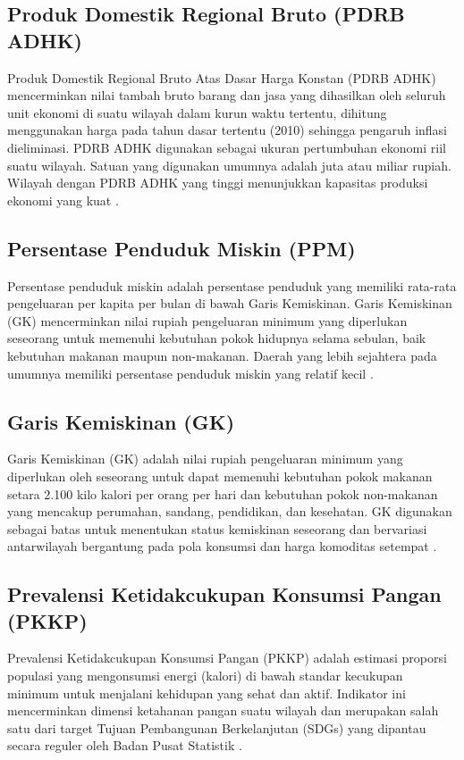 \subsection{\normalsize Produk Domestik Regional Bruto (PDRB ADHK)}
Produk Domestik Regional Bruto Atas Dasar Harga Konstan (PDRB ADHK) mencerminkan nilai tambah bruto barang dan jasa yang dihasilkan oleh seluruh unit ekonomi di suatu wilayah dalam kurun waktu tertentu, dihitung menggunakan harga pada tahun dasar tertentu (2010) sehingga pengaruh inflasi dieliminasi. PDRB ADHK digunakan sebagai ukuran pertumbuhan ekonomi riil suatu wilayah. Satuan yang digunakan umumnya adalah juta atau miliar rupiah. Wilayah dengan PDRB ADHK yang tinggi menunjukkan kapasitas produksi ekonomi yang kuat \citep{bpsikr2025}.

\subsection{\normalsize Persentase Penduduk Miskin (PPM)}
Persentase penduduk miskin adalah persentase penduduk yang memiliki rata-rata pengeluaran per kapita per bulan di bawah Garis Kemiskinan. Garis Kemiskinan (GK) mencerminkan nilai rupiah pengeluaran minimum yang diperlukan seseorang untuk memenuhi kebutuhan pokok hidupnya selama sebulan, baik kebutuhan makanan maupun non-makanan. Daerah yang lebih sejahtera pada umumnya memiliki persentase penduduk miskin yang relatif kecil \citep{bpsikr2025, alfia2024}.

\subsection{\normalsize Garis Kemiskinan (GK)}
Garis Kemiskinan (GK) adalah nilai rupiah pengeluaran minimum yang diperlukan oleh seseorang untuk dapat memenuhi kebutuhan pokok makanan setara 2.100 kilo kalori per orang per hari dan kebutuhan pokok non-makanan yang mencakup perumahan, sandang, pendidikan, dan kesehatan. GK digunakan sebagai batas untuk menentukan status kemiskinan seseorang dan bervariasi antarwilayah bergantung pada pola konsumsi dan harga komoditas setempat \citep{bpsikr2025}.

\subsection{\normalsize Prevalensi Ketidakcukupan Konsumsi Pangan (PKKP)}
Prevalensi Ketidakcukupan Konsumsi Pangan (PKKP) adalah estimasi proporsi populasi yang mengonsumsi energi (kalori) di bawah standar kecukupan minimum untuk menjalani kehidupan yang sehat dan aktif. Indikator ini mencerminkan dimensi ketahanan pangan suatu wilayah dan merupakan salah satu dari target Tujuan Pembangunan Berkelanjutan (SDGs) yang dipantau secara reguler oleh Badan Pusat Statistik \citep{bpsikr2025}.

